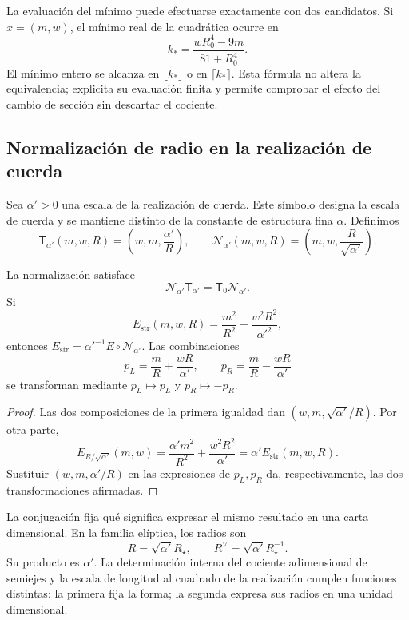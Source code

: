 La evaluación del mínimo puede efectuarse exactamente con dos
candidatos. Si \(x=(m,w)\), el mínimo real de la cuadrática
ocurre en
\[
 k_* =\frac{wR_0^4-9m}{81+R_0^4}.
\]
El mínimo entero se alcanza en \(\lfloor k_*\rfloor\) o en
\(\lceil k_*\rceil\). Esta fórmula no altera la equivalencia;
explicita su evaluación finita y permite comprobar el efecto
del cambio de sección sin descartar el cociente.

\subsection{Normalización de radio en la realización de cuerda}

Sea \(\alpha'>0\) una escala de la realización de cuerda.
Este símbolo designa la escala de cuerda y se mantiene distinto
de la constante de estructura fina \(\alpha\). Definimos
\begin{equation}
 \mathsf T_{\alpha'}(m,w,R)
 =\left(w,m,\frac{\alpha'}R\right),\qquad
 \mathcal N_{\alpha'}(m,w,R)
 =\left(m,w,\frac R{\sqrt{\alpha'}}\right).
 \label{iv:iv:eq:normalizacion-cuerda}
\end{equation}

\begin{theorem}
\label{iv:iv:thm:normalizacion-cuerda}
La normalización satisface
\[
 \mathcal N_{\alpha'}\mathsf T_{\alpha'}
 =\mathsf T_0\mathcal N_{\alpha'}.
\]
Si
\[
 E_{\mathrm{str}}(m,w,R)
 =\frac{m^2}{R^2}+\frac{w^2R^2}{\alpha'^2},
\]
entonces
\(E_{\mathrm{str}}=\alpha'^{-1}E\circ\mathcal N_{\alpha'}\).
Las combinaciones
\[
 p_L=\frac mR+\frac{wR}{\alpha'},\qquad
 p_R=\frac mR-\frac{wR}{\alpha'}
\]
se transforman mediante \(p_L\mapsto p_L\) y \(p_R\mapsto-p_R\).
\end{theorem}
\begin{proof}
Las dos composiciones de la primera igualdad dan
\((w,m,\sqrt{\alpha'}/R)\). Por otra parte,
\[
 E_{R/\sqrt{\alpha'}}(m,w)
 =\frac{\alpha'm^2}{R^2}+\frac{w^2R^2}{\alpha'}
 =\alpha'E_{\mathrm{str}}(m,w,R).
\]
Sustituir \((w,m,\alpha'/R)\) en las expresiones de
\(p_L,p_R\) da, respectivamente, las dos transformaciones
afirmadas.
\end{proof}

La conjugación fija qué significa expresar el mismo resultado en
una carta dimensional. En la familia elíptica, los radios son
\[
 R=\sqrt{\alpha'}R_\star,\qquad
 R^\vee=\sqrt{\alpha'}R_\star^{-1}.
\]
Su producto es \(\alpha'\). La determinación interna del cociente
adimensional de semiejes y la escala de longitud al cuadrado de la
realización cumplen funciones distintas: la primera fija la forma;
la segunda expresa sus radios en una unidad dimensional.

